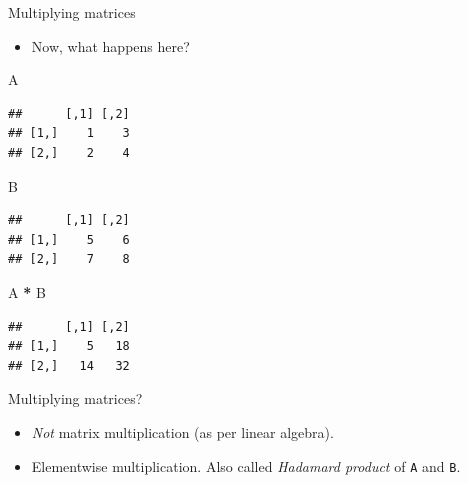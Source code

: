 \documentclass[ignorenonframetext,]{beamer}
\newenvironment{Shaded}{\begin{snugshade}}{\end{snugshade}}
\newcommand{\NormalTok}[1]{#1}
\newcommand{\OperatorTok}[1]{\textcolor[rgb]{0.81,0.36,0.00}{\textbf{#1}}}
\newcommand{\StringTok}[1]{\textcolor[rgb]{0.31,0.60,0.02}{#1}}
\providecommand{\tightlist}{%
  \setlength{\itemsep}{0pt}\setlength{\parskip}{0pt}}
\begin{document}
\begin{frame}[fragile]{Multiplying matrices}
\protect\hypertarget{multiplying-matrices}{}

\begin{itemize}
\tightlist
\item
  Now, what happens here?
\end{itemize}

\begin{Shaded}
\begin{Highlighting}[]
\NormalTok{A}
\end{Highlighting}
\end{Shaded}

\begin{verbatim}
##      [,1] [,2]
## [1,]    1    3
## [2,]    2    4
\end{verbatim}

\begin{Shaded}
\begin{Highlighting}[]
\NormalTok{B}
\end{Highlighting}
\end{Shaded}

\begin{verbatim}
##      [,1] [,2]
## [1,]    5    6
## [2,]    7    8
\end{verbatim}

\begin{Shaded}
\begin{Highlighting}[]
\NormalTok{A }\OperatorTok{*}\StringTok{ }\NormalTok{B}
\end{Highlighting}
\end{Shaded}

\begin{verbatim}
##      [,1] [,2]
## [1,]    5   18
## [2,]   14   32
\end{verbatim}

\end{frame}

\begin{frame}[fragile]{Multiplying matrices?}
\protect\hypertarget{multiplying-matrices-1}{}

\begin{itemize}
\tightlist
\item
  \emph{Not} matrix multiplication (as per linear algebra).
\item
  Elementwise multiplication. Also called \emph{Hadamard product} of
  \texttt{A} and \texttt{B}.
\end{itemize}

\end{frame}
\end{document}
